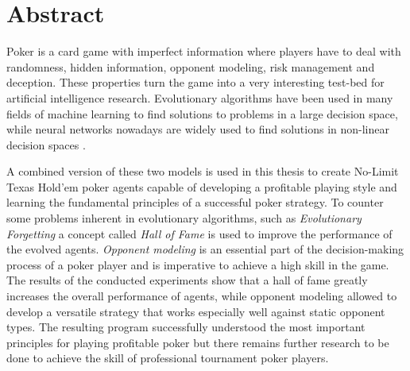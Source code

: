 

\chapter*{Abstract}
\label{cha:abstract}

Poker is a card game with imperfect information where players have to deal with randomness, hidden information, opponent modeling, risk management and deception. These properties turn the game into a very interesting test-bed for artificial intelligence research. Evolutionary algorithms have been used in many fields of machine learning to find solutions to problems in a large decision space, while neural networks nowadays are widely used to find solutions in non-linear decision spaces \cite{challenge_of_poker, evolutionary_methods}.\par
A combined version of these two models is used in this thesis to create No-Limit Texas Hold'em poker agents capable of developing a profitable playing style and learning the fundamental principles of a successful poker strategy. To counter some problems inherent in evolutionary algorithms, such as \textit{Evolutionary Forgetting} a concept called \textit{Hall of Fame} is used to improve the performance of the evolved agents. 
\textit{Opponent modeling} is an essential part of the decision-making process of a poker player and is imperative to achieve a high skill in the game. The results of the conducted experiments show that a hall of fame greatly increases the overall performance of agents, while opponent modeling allowed to develop a versatile strategy that works especially well against static opponent types. The resulting program successfully understood the most important principles for playing profitable poker but there remains further research to be done to achieve the skill of professional tournament poker players.
